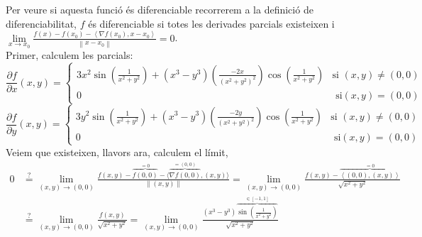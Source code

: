 \documentclass[a4paper, 12pt]{article}
\begin{document}
    \begin{solucio}
        Per veure si aquesta funció és diferenciable recorrerem a la definició de diferenciabilitat,
        $f$ és diferenciable si totes les derivades parcials existeixen i $\lim\limits_{x \to x_0} \frac{f\left(x\right) - f\left(x_0\right)-\left\langle \nabla f\left(x_0\right), x-x_0\right\rangle }{\left\lVert x-x_0\right\rVert } = 0$.\\
        Primer, calculem les parcials:
        \begin{displaymath}
            \frac{\partial f}{\partial x}(x,y) = 
            \begin{cases}
                3x^2\sin{\left(\frac{1}{x^2+y^2}\right)} +  \left(x^3-y^3\right)\left(\frac{-2x}{\left(x^2+y^2\right)^2}\right)\cos{\left(\frac{1}{x^2+y^2}\right)} & \text{si } \left(x,y\right)  \neq \left(0,0\right)\\
                0 & \text{ si} \left(x,y\right) = \left(0,0\right) 
            \end{cases}
        \end{displaymath}
        \begin{displaymath}
            \frac{\partial f}{\partial y}(x,y) = 
            \begin{cases}
                3y^2\sin{\left(\frac{1}{x^2+y^2}\right)} +  \left(x^3-y^3\right)\left(\frac{-2y}{\left(x^2+y^2\right)^2}\right)\cos{\left(\frac{1}{x^2+y^2}\right)} & \text{si } \left(x,y\right)  \neq \left(0,0\right)\\
                0 & \text{ si} \left(x,y\right) = \left(0,0\right) 
            \end{cases}
        \end{displaymath}
        Veiem que existeixen, llavors ara, calculem el límit,
        \begin{displaymath}
            \begin{split}
            0 &\stackrel{?}{=} \lim\limits_{\left(x,y\right) \to \left(0,0\right)}\frac{f\left(x,y\right)-\overbrace{f\left(0,0\right)}^{ = 0}-\langle\overbrace{\nabla f\left(0, 0\right)}^{= \left(0,0\right)}, \left(x, y\right)\rangle}{\left\lVert\left(x, y\right)\right\rVert} = \lim\limits_{\left(x,y\right) \to \left(0,0\right)} \frac{f\left(x,y\right) - \overbrace{\left\langle\left(0,0\right),\left(x,y\right)\right\rangle}^{=0}}{\sqrt{x^2+y^2}}\\
              &\stackrel{?}{=} \lim\limits_{\left(x,y\right) \to \left(0,0\right)} \frac{f\left(x,y\right)}{\sqrt{x^2+y^2}} = \lim\limits_{\left(x,y\right) \to \left(0,0\right)} \frac{\left(x^3-y^3\right)\overbrace{\sin{\left(\frac{1}{x^2+y^2}\right)}}^{\in[-1, 1]}}{\sqrt{x^2+y^2}}\\

\end{split}
\end{displaymath}
\end{solucio}
\end{document}
